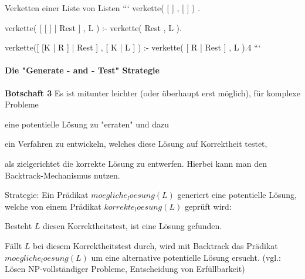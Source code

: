 \documentclass[a4paper]{article}
\renewcommand{\note}[2]{\begin{noteBox} \textbf{#1} #2 \end{noteBox}}
\begin{document}
\begin{multicols}{3}
  Verketten einer Liste von Listen
  ```
  verkette( [ ] , [ ] ) .

  verkette( [ [ ] | Rest ] , L ) :-
  verkette( Rest , L ).

  verkette([ [K | R ] | Rest ] , [ K | L ] ) :-
  verkette( [ R | Rest ] , L ).4
  ```

  \paragraph{Die "Generate - and - Test" Strategie}
  \note{Botschaft  3}{Es ist mitunter leichter (oder überhaupt erst möglich), für komplexe Probleme
    \begin{enumerate*}
      \item eine potentielle Lösung zu "erraten" und dazu
      \item ein Verfahren zu entwickeln, welches diese Lösung auf Korrektheit testet,
    \end{enumerate*}
    als zielgerichtet die korrekte Lösung zu entwerfen. Hierbei kann man den Backtrack-Mechanismus nutzen.}

  Strategie: Ein Prädikat $moegliche_loesung(L)$ generiert eine potentielle Lösung, welche von einem Prädikat $korrekte_loesung(L)$ geprüft wird:
  \begin{itemize*}
    \item Besteht $L$ diesen Korrektheitstest, ist eine Lösung gefunden.
    \item Fällt $L$ bei diesem Korrektheitstest durch, wird mit Backtrack das Prädikat $moegliche_loesung(L)$ um eine alternative potentielle Lösung ersucht.
    (vgl.: Lösen NP-vollständiger Probleme, Entscheidung von Erfüllbarkeit)
  \end{itemize*}


\end{multicols}
\end{document}

